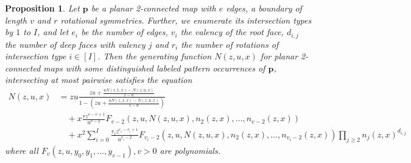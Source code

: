 \documentclass[reqno, 11pt]{amsart}
\newtheorem{proposition}{Proposition}
\theoremstyle{definition}
\theoremstyle{remark}
\newcommand{\map}[1]{\textbf{#1}}
\numberwithin{equation}{section}
\begin{document}
\begin{proposition} \label{thm:nonsep_dec}
    Let $\map{p}$ be a planar 2-connected map with $e$ edges, a boundary of length $v$ and $r$ rotational symmetries. Further, we enumerate its intersection types by $1$ to $I$, and let $e_i$ be the number of edges, $v_i$ the valency of the root face, $d_{i,j}$ the number of deep faces with valency $j$ and $r_i$ the number of rotations of intersection type $i \in [I]$. Then the generating function $N(z,u,x)$ for planar 2-connected maps with some distinguished labeled pattern occurrences of $\map{p}$, intersecting at most pairwise satisfies the equation
    \begin{align*}
        N(z,u,x) &= zu\frac{zu+\frac{uN(z,1,x)-N(z,u,x)}{1-u}}{1-\left(zu+\frac{uN(z,1,x)-N(z,u,x)}{1-u}\right)} \\
        &\quad + x\frac{rz^{e-v+1}}{u^{v-2}}F_{v-2}(z,u,N(z,u,x),n_2(z,x),\dots,n_{v-2}(z,x))\\
        &\quad + x^2\sum_{i=0}^I \frac{r_iz^{e_i-v_i+1}}{u^{v_i-2}}F_{v_i-2}(z,u,N(z,u,x),n_2(z,x),\dots,n_{v_i-2}(z,x))\prod_{j\geq 2} n_j(z,x)^{d_{i,j}}
    \end{align*}
    where all $F_v(z,u,y_0,y_1,\dots, y_{v-1}), v>0$ are polynomials.
\end{proposition}
\end{document}

